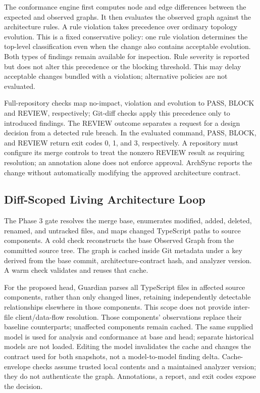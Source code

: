 The conformance engine first computes node and edge differences between the expected and observed graphs. It then evaluates the observed graph against the architecture rules. A rule violation takes precedence over ordinary topology evolution. This is a fixed conservative policy: one rule violation determines the top-level classification even when the change also contains acceptable evolution. Both types of findings remain available for inspection. Rule severity is reported but does not alter this precedence or the blocking threshold. This may delay acceptable changes bundled with a violation; alternative policies are not evaluated.

Full-repository checks map no-impact, violation and evolution to PASS, BLOCK and REVIEW, respectively; Git-diff checks apply this precedence only to introduced findings.
The REVIEW outcome separates a request for a design decision from a detected rule breach. In the evaluated command, PASS, BLOCK, and REVIEW return exit codes 0, 1, and 3, respectively. A repository must configure its merge controls to treat the nonzero REVIEW result as requiring resolution; an annotation alone does not enforce approval. ArchSync reports the change without automatically modifying the approved architecture contract.

\subsection{Diff-Scoped Living Architecture Loop}

The Phase 3 gate resolves the merge base, enumerates modified, added, deleted, renamed, and untracked files, and maps changed TypeScript paths to source components. A cold check reconstructs the base Observed Graph from the committed source tree. The graph is cached inside Git metadata under a key derived from the base commit, architecture-contract hash, and analyzer version. A warm check validates and reuses that cache.

For the proposed head, Guardian parses all TypeScript files in affected source components, rather than only changed lines, retaining independently detectable relationships elsewhere in those components. This scope does not provide inter-file client/data-flow resolution. Those components' observations replace their baseline counterparts; unaffected components remain cached. The same supplied model is used for analysis and conformance at base and head; separate historical models are not loaded. Editing the model invalidates the cache and changes the contract used for both snapshots, not a model-to-model finding delta. Cache-envelope checks assume trusted local contents and a maintained analyzer version; they do not authenticate the graph. Annotations, a report, and exit codes expose the decision.

